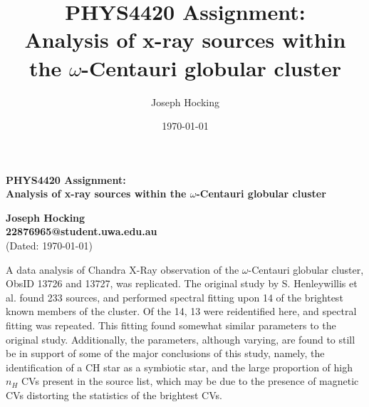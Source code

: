 \documentclass[aps,
                pra,  
                a4paper, 
                amsmath, 
                amssymb, 
                preprint,
                tightenlines,  
                amsfonts,
                nofootinbib,
                notitlepage
            ]{revtex4-2}
\begin{document}
\title{PHYS4420 Assignment:\\Analysis of x-ray sources within the $\omega$-Centauri globular cluster}

\author{Joseph Hocking}
\noaffiliation

\date{\today}

\begin{center}
        
    \Large
    \textbf{PHYS4420 Assignment:\\Analysis of x-ray sources within the $\omega$-Centauri globular cluster}
        
    \vspace{1.5cm}
    \normalsize
    \textbf{Joseph Hocking\\22876965@student.uwa.edu.au}\\
    (Dated: \today)
\end{center}

\begin{center}
    A data analysis of Chandra X-Ray observation of the $\omega$-Centauri globular cluster, ObsID 13726 and 13727, was replicated. The original study by S. Henleywillis et al. found 233 sources, and performed spectral fitting upon 14 of the brightest known members of the cluster. Of the 14, 13 were reidentified here, and spectral fitting was repeated. This fitting found somewhat similar parameters to the original study. Additionally, the parameters, although varying, are found to still be in support of some of the major conclusions of this study, namely, the identification of a CH star as a symbiotic star, and the large proportion of high $n_H$ CVs present in the source list, which may be due to the presence of magnetic CVs distorting the statistics of the brightest CVs.
\end{center}
\end{document}

